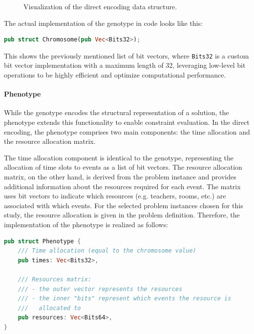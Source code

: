 \documentclass[english,examples]{isasthesis}
\begin{document}
\begin{figure}
    \centering
    

    \caption{Visualization of the direct encoding data structure.}
    \label{fig:direct_encoding}
\end{figure}



The actual implementation of the genotype in code looks like this:
\begin{lstlisting}[language=Rust]
pub struct Chromosome(pub Vec<Bits32>);
\end{lstlisting}
This shows the previously mentioned list of bit vectors, where
\lstinline[language=Rust]{Bits32} is a custom bit vector implementation with
a maximum length of 32, leveraging low-level bit operations to be highly
efficient and optimize computational performance.

\paragraph{Phenotype}
While the genotype encodes the structural representation of a solution, the
phenotype extends this functionality to enable constraint evaluation. In the
direct encoding, the phenotype comprises two main components: the time
allocation and the resource allocation matrix.

The time allocation component is identical to the genotype, representing the
allocation of time slots to events as a list of bit vectors. The resource
allocation matrix, on the other hand, is derived from the problem instance and
provides additional information about the resources required for each event.
The matrix uses bit vectors to indicate which resources (e.g. teachers, rooms,
etc.) are associated with which events.
For the selected problem instances chosen for this study, the resource
allocation is given in the problem definition. Therefore, the implementation
of the phenotype is realized as follows:
\begin{lstlisting}[language=Rust]
pub struct Phenotype {
    /// Time allocation (equal to the chromosome value)
    pub times: Vec<Bits32>,

    /// Resources matrix:
    /// - the outer vector represents the resources
    /// - the inner "bits" represent which events the resource is
    ///   allocated to
    pub resources: Vec<Bits64>,
}
\end{lstlisting}
\end{document}
